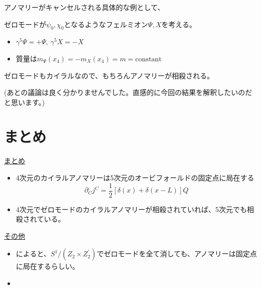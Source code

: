 \documentclass[
  unicode,a4paper,9pt,
  xcolor = {dvipsnames,svgnames},
  hyperref ={colorlinks=true,citecolor=Navy,linkcolor=NavyBlue,urlcolor=purple},
  ja=standard,lualatex
]{beamer}
\begin{document}
\begin{frame}
  \frametitle{\subsecname}

  アノマリーがキャンセルされる具体的な例として、

  ゼロモードが$\psi_{0},\chi_{0}$となるようなフェルミオン$\Psi,X$を考える。
  \begin{itemize}
    \item 
    $\gamma^{5}\Psi=+\Psi,\ \gamma^{5}X=-X$
    \item 
    質量は$m_{\Psi}(x_{4})=-m_{X}(x_{4})=m=\mathrm{constant}$
  \end{itemize}

  ゼロモードもカイラルなので、もちろんアノマリーが相殺される。  

  \vspace*{5pt}

  (あとの議論は良く分かりませんでした。直感的に今回の結果を解釈したいのだと思います。)

\end{frame}




\section{まとめ}

\begin{frame}[plain]
  \huge \secname
\end{frame}

\begin{frame}

  
  \uline{まとめ}

  \begin{itemize}
    \item 
    4次元のカイラルアノマリーは5次元のオービフォールドの固定点に局在する
    \begin{equation*}
      \partial_{C}j^{C}
      =
      \frac{1}{2}\left[ \delta(x)+\delta(x-L) \right]Q
    \end{equation*}
    \item 
    4次元でゼロモードのカイラルアノマリーが相殺されていれば、5次元でも相殺されている。
  \end{itemize}

  \uline{その他}
  
  \begin{itemize}
    \item 
    \cite{Scrucca:2001eb}によると、$S^{1}/(Z_{2}\times Z_{2}^{\prime})$でゼロモードを全て消しても、アノマリーは固定点に局在するらしい。
    \item 

  \end{itemize}

\end{frame}
\end{document}
